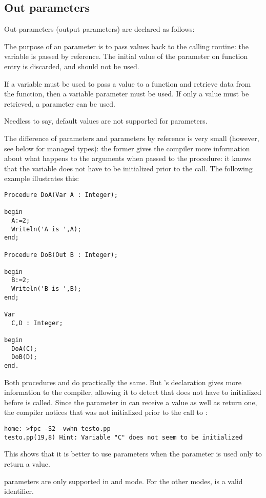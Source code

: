\subsection{Out parameters}
\label{se:outparams}
Out parameters  (output parameters) are declared as follows:

The purpose of an  parameter is to pass values back to the calling
routine: the variable is passed by reference. The initial value of the 
parameter on function entry is discarded, and should not be used.

If a variable must be used to pass a value to a function and retrieve data
from the function, then a variable parameter must be used. If only a value
must be retrieved, a  parameter can be used.

Needless to say, default values are not supported for  parameters.

The difference of  parameters and parameters by reference is very small 
(however, see below for managed types):
the former gives the compiler more information about what happens to the
arguments when passed to the procedure: it knows that the variable does not
have to be initialized prior to the call. The following example illustrates
this:
\begin{verbatim}
Procedure DoA(Var A : Integer);

begin
  A:=2;
  Writeln('A is ',A);
end;

Procedure DoB(Out B : Integer);

begin
  B:=2;
  Writeln('B is ',B);
end;

Var
  C,D : Integer;

begin
  DoA(C);
  DoB(D);
end.
\end{verbatim}
Both procedures  and  do practically the same. But
's declaration gives more information to the compiler, allowing
it to detect that  does not have to initialized before 
is called. Since the parameter  in  can receive a value as
well as return one, the compiler notices that  was not initialized
prior to the call to :
\begin{verbatim}
home: >fpc -S2 -vwhn testo.pp
testo.pp(19,8) Hint: Variable "C" does not seem to be initialized
\end{verbatim}
This shows that it is better to use  parameters when the parameter
is used only to return a value.

\begin{remark}
 parameters are only supported in  and  mode. For the other 
modes,  is a valid identifier.
\end{remark}

